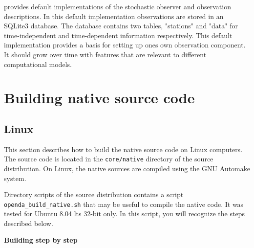 \oda provides default implementations of the stochastic observer and observation descriptions. In this default implementation observations are stored in an SQLite3 database. The database contains two tables, "stations" and "data" for time-independent and time-dependent information respectively. This default implementation provides a basis for setting up ones own observation component. It should grow over time with features that are relevant to different computational models. 

\section{Building native source code}

\subsection{Linux}\label{sec:buildLinux}

This section describes how to build the \oda native source code on Linux computers. The source code is located in the \verb|core/native| directory of the source distribution. On Linux, the native sources are compiled using the GNU Automake system.

Directory scripts of the source distribution contains a script \verb|openda_build_native.sh| that may be useful to compile the native code. It was tested for Ubuntu 8.04 lts 32-bit only. In this script, you will recognize the steps described below.

\textbf{Building step by step}

